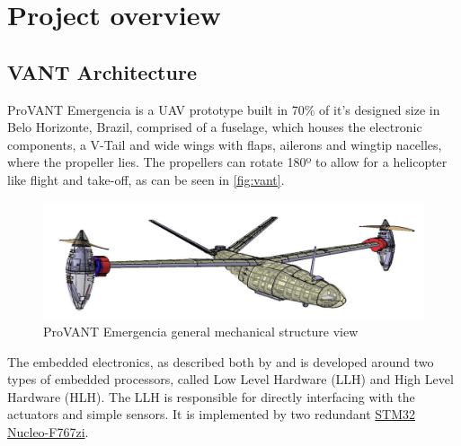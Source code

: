 \chapter{Project overview}

\section{VANT Architecture}

ProVANT Emergencia is a \gls{UAV} prototype built in 70\% of it's designed size in Belo Horizonte, Brazil\footnotemark, comprised of a fuselage, which houses the electronic components, a V-Tail and wide wings with flaps, ailerons and wingtip nacelles, where the propeller lies. The propellers can rotate 180º to allow for a helicopter like flight and take-off, as can be seen in \autoref{fig:vant}. \cite{merchan_design_2021}


\begin{figure}[htb]
	\caption{\label{fig:vant}ProVANT Emergencia general mechanical structure view}
	\begin{center}
	    \includegraphics[width=.7\linewidth]{images/VANT.png}
	\end{center}
\end{figure}

The embedded electronics, as described both by \textcite{lara_design_2019} and \textcite{merchan_design_2021} is developed around two types of embedded processors, called Low Level Hardware (\gls{LLH}) and High Level Hardware (\gls{HLH}). The \gls{LLH} is responsible for directly interfacing with the actuators and simple sensors. It is implemented by two redundant \href{https://www.st.com/en/evaluation-tools/nucleo-f767zi.html}{STM32 Nucleo-F767zi}. 

